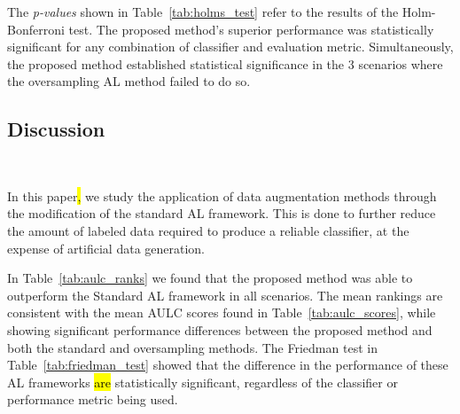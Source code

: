 \documentclass[preprint, 12pt]{elsarticle}
\begin{document}
The \textit{p-values} shown in Table~\ref{tab:holms_test} refer to the results
of the Holm-Bonferroni test. The proposed method's superior performance was
statistically significant for any combination of classifier and evaluation
metric. Simultaneously, the proposed method established statistical
significance in the 3 scenarios where the oversampling AL method failed to do
so.

\begin{table}
	\centering
    \caption{%
        Adjusted p-values using the Holm-Bonferroni method. Bold values are
        statistically significant at a level of $\alpha = 0.05$. The null
        hypothesis is that the Oversampling or Proposed method does not
        perform better than the control method (Standard AL framework).
    }\label{tab:holms_test}
\end{table}

\subsection{Discussion}~\label{sec:sub_discussion}

In this paper\hl{,} we study the application of data augmentation methods
through the modification of the standard AL framework. This is done to further
reduce the amount of labeled data required to produce a reliable classifier,
at the expense of artificial data generation.
 
In Table~\ref{tab:aulc_ranks} we found that the proposed method was able to
outperform the Standard AL framework in all scenarios. The mean rankings are
consistent with the mean AULC scores found in Table~\ref{tab:aulc_scores},
while showing significant performance differences between the proposed method
and both the standard and oversampling methods. The Friedman test in
Table~\ref{tab:friedman_test} showed that the difference in the performance of
these AL frameworks \hl{are} statistically significant, regardless of the
classifier or performance metric being used.
 
\end{document}
